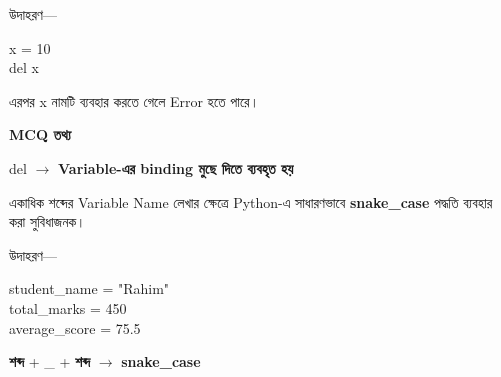 উদাহরণ—

\begin{codebox}

\begin{english}
\ttfamily
x = 10\\
del x
\end{english}

\end{codebox}

এরপর
\textenglish{\ttfamily x}
নামটি ব্যবহার করতে গেলে Error হতে পারে।

\begin{rememberbox}

\textbf{\color{deepOrange}MCQ তথ্য}

\begin{center}

\textenglish{\ttfamily del}
\(\longrightarrow\)
\textbf{Variable-এর binding মুছে দিতে ব্যবহৃত হয়}

\end{center}

\end{rememberbox}



একাধিক শব্দের Variable Name লেখার ক্ষেত্রে Python-এ সাধারণভাবে
\textbf{snake\_case} পদ্ধতি ব্যবহার করা সুবিধাজনক।

উদাহরণ—

\begin{codebox}

\begin{english}
\ttfamily
student\_name = "Rahim"\\
total\_marks = 450\\
average\_score = 75.5
\end{english}

\end{codebox}

\begin{center}

\textbf{শব্দ}
+
\textenglish{\ttfamily \_}
+
\textbf{শব্দ}
\(\longrightarrow\)
\textbf{snake\_case}

\end{center}


